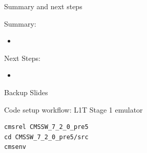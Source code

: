 \documentclass[8pt]{beamer}
\begin{document}
\begin{frame}{Summary and next steps}
 
\begin{block}{Summary:}
 
\begin{itemize}
  \item 
\end{itemize}

\end{block}

\begin{block}{Next Steps:}
 
\begin{itemize}
  \item 
\end{itemize}
 
\end{block}

\end{frame}


\appendix
\begin{frame}
 
\begin{block}

\begin{center}Backup Slides\end{center}

\end{block}

\end{frame}


\begin{frame}{Code setup workflow: L1T Stage 1 emulator}

\begin{block}

\begin{verbatim}
cmsrel CMSSW_7_2_0_pre5
cd CMSSW_7_2_0_pre5/src
cmsenv
\end{verbatim}

\end{block}

\end{frame}
\end{document}
